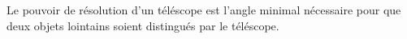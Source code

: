 \documentclass[a4paper]{article}
\begin{document}
\pagestyle{fancy}
\fancyhf{}
\setlength{\headheight}{15pt}

\begin{center}
	\large{}
\end{center}


Le pouvoir de résolution d'un téléscope est l'angle minimal nécessaire pour que deux objets lointains soient distingués par le téléscope.
\end{document}
